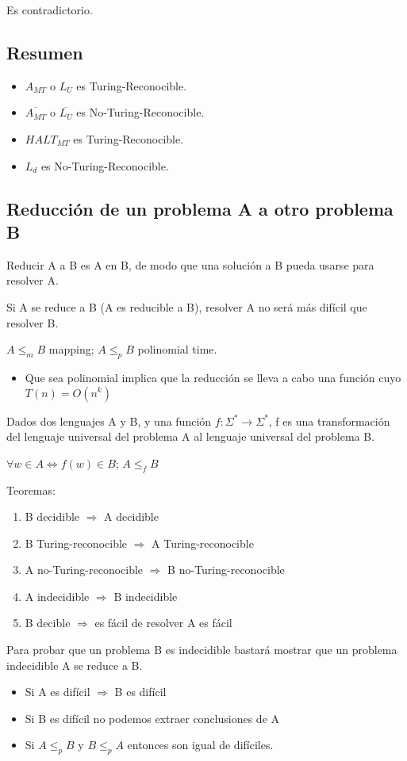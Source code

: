 Es contradictorio.

\subsection{Resumen}
\begin{itemize}
    \item $A_{MT}$ o $L_U$ es Turing-Reconocible.
    \item $\overline{A_{MT}}$ o $\overline{L_U}$ es No-Turing-Reconocible.
    \item $HALT_{MT}$ es Turing-Reconocible.
    \item $L_d$ es No-Turing-Reconocible.
\end{itemize}

\subsection{Reducción de un problema A a otro problema B}
Reducir A a B es A en B, de modo que una solución a B pueda usarse para resolver A.

Si A se reduce a B (A es reducible a B), resolver A no será más difícil que resolver B.

$A \leq_m B$ mapping; $A \leq_p B$ polinomial time.
\begin{itemize}
    \item Que sea polinomial implica que la reducción se lleva a cabo una función cuyo $T(n)= O(n^k)$
\end{itemize}

Dados dos lenguajes A y B, y una función $f:\Sigma^* \rightarrow \Sigma^*$, f es una transformación del lenguaje universal del problema A al lenguaje universal del problema B.

$\forall w\in A \Leftrightarrow f(w)\in B$; $ A \leq_f B$

Teoremas:
\begin{enumerate}
    \item B decidible $\Rightarrow$ A decidible
    \item B Turing-reconocible $\Rightarrow$ A Turing-reconocible
    \item A no-Turing-reconocible $\Rightarrow$ B no-Turing-reconocible
    \item A indecidible $\Rightarrow$ B indecidible
    \item B decible $\Rightarrow$ es fácil de resolver A es fácil
\end{enumerate}

Para probar que un problema B es indecidible bastará mostrar que un problema indecidible A se reduce a B.
\begin{itemize}
    \item Si A es difícil $\Rightarrow$ B es difícil
    \item Si B es difícil no podemos extraer conclusiones de A
    \item Si $A \leq_p B$ y $B \leq_p A$ entonces son igual de difíciles.
\end{itemize}

